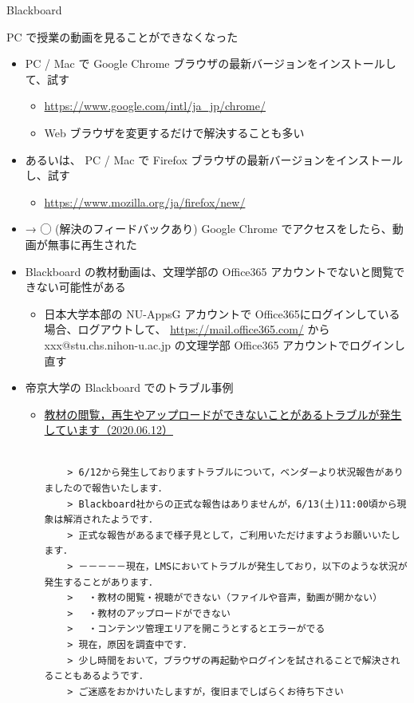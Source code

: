 \documentclass[a4j,10pt]{jsarticle}
\begin{document}
{\begin{frame}[label={sec:orgc119bb0},fragile]{Blackboard}
\begin{block}{PC で授業の動画を見ることができなくなった}
\begin{itemize}
\par
\item PC / Mac で Google Chrome ブラウザの最新バージョンをインストールして、試す
\begin{itemize}
\item \url{https://www.google.com/intl/ja\_jp/chrome/}
\item Web ブラウザを変更するだけで解決することも多い
\end{itemize}
\par
\item あるいは、 PC / Mac で Firefox ブラウザの最新バージョンをインストールし、試す
\begin{itemize}
\item \url{https://www.mozilla.org/ja/firefox/new/}
\end{itemize}
\par
\item → ◯ (解決のフィードバックあり) Google Chrome でアクセスをしたら、動画が無事に再生された
\par
\item Blackboard の教材動画は、文理学部の Office365 アカウントでないと閲覧できない可能性がある
\begin{itemize}
\item 日本大学本部の NU-AppsG アカウントで Office365にログインしている場合、ログアウトして、
\url{https://mail.office365.com/} から xxx@stu.chs.nihon-u.ac.jp の文理学部 Office365 アカウントでログインし直す
\end{itemize}
\par
\item 帝京大学の Blackboard でのトラブル事例
\begin{itemize}
\item \href{http://www.lt-lab.teikyo-u.ac.jp/lms-ss/index.php?\%A4\%AA\%C3\%CE\%A4\%E9\%A4\%BB\%2F\%B2\%E1\%B5\%EE\%A4\%CE\%C9\%D4\%B6\%F1\%B9\%E7\%BE\%F0\%CA\%F3}{教材の閲覧，再生やアップロードができないことがあるトラブルが発生しています（2020.06.12）}
\par
\begin{verbatim}

    > 6/12から発生しておりますトラブルについて，ベンダーより状況報告がありましたので報告いたします．
    > Blackboard社からの正式な報告はありませんが，6/13(土)11:00頃から現象は解消されたようです．
    > 正式な報告があるまで様子見として，ご利用いただけますようお願いいたします．
    > －－－－－現在，LMSにおいてトラブルが発生しており，以下のような状況が発生することがあります．
    > 　・教材の閲覧・視聴ができない（ファイルや音声，動画が開かない）
    > 　・教材のアップロードができない
    > 　・コンテンツ管理エリアを開こうとするとエラーがでる
    > 現在，原因を調査中です．
    > 少し時間をおいて，ブラウザの再起動やログインを試されることで解決されることもあるようです．
    > ご迷惑をおかけいたしますが，復旧までしばらくお待ち下さい\end{verbatim}


\end{itemize}
\end{itemize}
\end{block}
\end{frame}}
\end{document}
